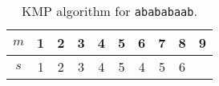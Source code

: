 \begin{table}[!ht]
    \centering
    \begin{tabular}{|c||c|c|c|c|c|c|c|c|c|}
        \hline
        $m$ & 1 & 2 & 3 & 4 & 5 & 6 & 7 & 8 & 9 \\
        \hline
        $s$ & 1 & 2 & 3 & 4 & 5 & 4 & 5 & 6 & \\
        \hline
    \end{tabular}
    \caption{KMP algorithm for \texttt{abababaab}.}
    \label{tab:030406a}
\end{table}